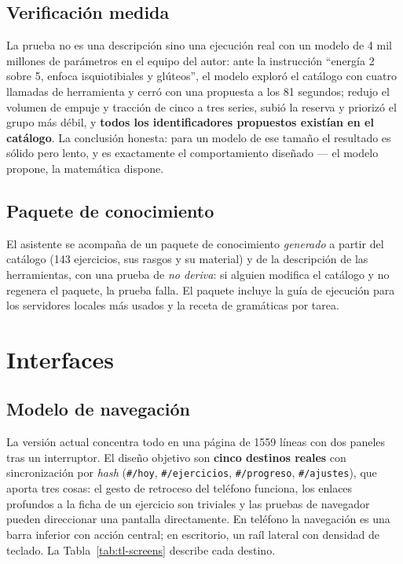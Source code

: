 \documentclass[conference]{IEEEtran}
\newcommand{\code}[1]{\texttt{\small #1}}
\begin{document}
\subsection{Verificaci\'on medida}
La prueba no es una descripci\'on sino una ejecuci\'on real con un modelo de 4
mil millones de par\'ametros en el equipo del autor: ante la instrucci\'on
``energ\'ia 2 sobre 5, enfoca isquiotibiales y gl\'uteos'', el modelo explor\'o el
cat\'alogo con cuatro llamadas de herramienta y cerr\'o con una propuesta a los
81 segundos; redujo el volumen de empuje y tracci\'on de cinco a tres series,
subi\'o la reserva y priorizó el grupo m\'as d\'ebil, y \textbf{todos los
identificadores propuestos exist\'ian en el cat\'alogo}. La conclusi\'on honesta:
para un modelo de ese tama\~no el resultado es s\'olido pero lento, y es
exactamente el comportamiento dise\~nado --- el modelo propone, la matem\'atica
dispone.

\subsection{Paquete de conocimiento}
El asistente se acompa\~na de un paquete de conocimiento \emph{generado} a partir
del cat\'alogo (143 ejercicios, sus rasgos y su material) y de la descripci\'on
de las herramientas, con una prueba de \emph{no deriva}: si alguien modifica el
cat\'alogo y no regenera el paquete, la prueba falla. El paquete incluye la
gu\'ia de ejecuci\'on para los servidores locales m\'as usados y la receta de
gram\'aticas por tarea.

\section{Interfaces}

\subsection{Modelo de navegaci\'on}
La versi\'on actual concentra todo en una p\'agina de 1559 l\'ineas con dos
paneles tras un interruptor. El dise\~no objetivo son \textbf{cinco destinos
reales} con sincronizaci\'on por \emph{hash} (\code{\#/hoy},
\code{\#/ejercicios}, \code{\#/progreso}, \code{\#/ajustes}), que aporta tres
cosas: el gesto de retroceso del tel\'efono funciona, los enlaces profundos a la
ficha de un ejercicio son triviales y las pruebas de navegador pueden direccionar
una pantalla directamente. En tel\'efono la navegaci\'on es una barra inferior
con acci\'on central; en escritorio, un ra\'il lateral con densidad de teclado.
La Tabla~\ref{tab:tl-screens} describe cada destino.
\end{document}
